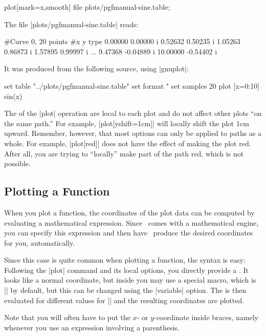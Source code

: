 \begin{codeexample}[]
\tikz \draw plot[mark=x,smooth] file {plots/pgfmanual-sine.table};
\end{codeexample}

The file |plots/pgfmanual-sine.table| reads:
\begin{codeexample}
#Curve 0, 20 points
#x y type
0.00000 0.00000  i
0.52632 0.50235  i
1.05263 0.86873  i
1.57895 0.99997  i
...
9.47368 -0.04889  i
10.00000 -0.54402  i
\end{codeexample}
It was produced from the following source, using |gnuplot|:
\begin{codeexample}
set table  "../plots/pgfmanual-sine.table"
set format "%
set samples 20
plot [x=0:10] sin(x)
\end{codeexample}

The  of the |plot| operation are local to each
plot and do not affect other plots ``on the same path.'' For example,
|plot[yshift=1cm]| will locally shift the plot 1cm upward. Remember,
however, that most options can only be applied to paths as a
whole. For example, |plot[red]| does not have the effect of making the
plot red. After all, you are trying to ``locally'' make part of the
path red, which is not possible.

\subsection{Plotting a Function}
\label{section-tikz-plot}

When you plot a function, the coordinates of the plot data can be
computed by evaluating a mathematical expression. Since \pgfname\
comes with a mathematical engine, you can specify this expression and
then have \tikzname\ produce the desired coordinates for you,
automatically.

Since this case is quite common when plotting a function, the syntax
is easy: Following the |plot| command and its local options, you
directly provide a \meta{coordinate expression}. It looks like a
normal coordinate, but inside you may use a special macro, which is
|\x| by default, but this can be changed using the |variable|
option. The  is then evaluated for
different values for |\x| and the resulting coordinates are plotted.

Note that you will often have to put the $x$- or $y$-coordinate inside
braces, namely whenever you use an expression involving a parenthesis.

